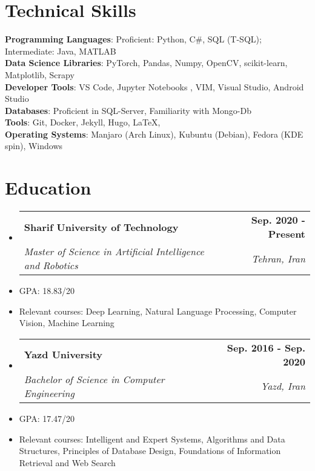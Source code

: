 \documentclass[letterpaper,11pt]{article}
\makeatletter
\newcommand{\resumeSubheading}[4]{
  \vspace{-2pt}\item
    \begin{tabular*}{1.0\textwidth}[t]{l@{\extracolsep{\fill}}r}
      \textbf{#1} & \textbf{\small #2} \\
    \textcolor{sgray} {\textit{\small#3}} & \textcolor{sgray}{ \textit{\small #4} }\\
    \end{tabular*}\vspace{-7pt}
}
\newcommand{\resumeSubHeadingListStart}{\begin{itemize}[leftmargin=0.0in, label={}]}
\newcommand{\resumeSubHeadingListEnd}{\end{itemize}}
\makeatother
\begin{document}
\section{Technical Skills}
\begin{itemize}[leftmargin=0.15in, 
	label={}
	]
	\small{\item{
			\textbf{Programming Languages}{: Proficient: Python, C\#, SQL (T-SQL); Intermediate: Java, MATLAB } \\
			\textbf{Data Science Libraries}: PyTorch, Pandas, Numpy, OpenCV, scikit-learn, Matplotlib, Scrapy \\
			\textbf{Developer Tools}{:  VS Code, Jupyter Notebooks , VIM, Visual Studio, Android Studio} \\
			\textbf{Databases}{: Proficient in SQL-Server, Familiarity with Mongo-Db } \\
			\textbf{Tools}{: Git, Docker, Jekyll, Hugo, \LaTeX , } \\
			\textbf{Operating Systems}{: Manjaro  (Arch Linux), Kubuntu  (Debian), Fedora (KDE spin), Windows } \\
	}}
\end{itemize}
\vspace{-16pt}



\section{Education}
  \resumeSubHeadingListStart
    \resumeSubheading
      {Sharif University of Technology}{Sep. 2020 - Present}
      {Master of Science in Artificial Intelligence and Robotics}{Tehran, Iran}
  \resumeSubHeadingListEnd
    

\begin{itemize}[itemsep=-3pt, parsep=5pt]
\item  GPA: 18.83/20

\item Relevant courses:
Deep Learning,
Natural Language Processing, Computer Vision,
Machine Learning 
\end{itemize}  


  \resumeSubHeadingListStart
    \resumeSubheading
      {Yazd University}{Sep. 2016 - Sep. 2020}
      {Bachelor of Science in Computer Engineering}{Yazd, Iran}
  \resumeSubHeadingListEnd
  
\begin{itemize}[itemsep=-3pt, parsep=5pt]
	\item  GPA: 17.47/20
	
	\item Relevant courses:
	Intelligent and Expert Systems, Algorithms and Data Structures, Principles of Database Design, Foundations of Information Retrieval and Web Search
\end{itemize}  
\end{document}
